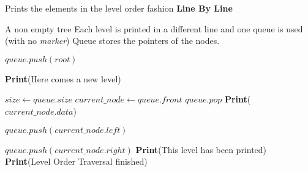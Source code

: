 \documentclass[12pt]{article}
\begin{document}
\begin{algorithm}

  \caption{Prints the elements in the level order fashion \textbf{Line By Line}}
  \begin{algorithmic}[1]
    \Require A non empty tree
    \Ensure Each level is printed in a different line and one queue is used (with no \textit{marker})
    \Statex
        \LeftComment Queue stores the pointers of the nodes.
        
        \Statex
        \State $queue.push(root)$
        
            \State \textbf{Print}(Here comes a new level)
            
            \State $size \gets queue.size$
                \State $current\_node\gets queue.front $
                \State $queue.pop$
                \State \textbf{Print}($current\_node.data$)
                
                    \State $queue.push(current\_node.left)$
                \EndIf
                
                    \State $queue.push(current\_node.right)$
                \EndIf
            \EndFor
            \State \textbf{Print}(This level has been printed)
        \EndWhile
        \Statex
        \State \textbf{Print}(Level Order Traversal finished)
    \EndFunction
  \end{algorithmic}
  
\end{algorithm}
\end{document}
